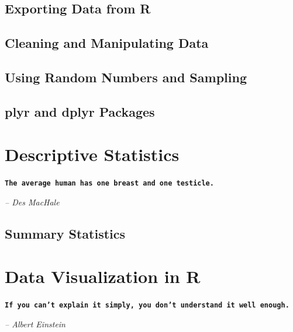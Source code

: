 \documentclass[10pt, letterpaper, twoside]{memoir}\usepackage{knitr}
\newcommand{\chapterendsymbol}{
    \vspace{24pt}
    \Huge
    \hrulefill \hspace{0.1in} \hspace{0.1in} \hrulefill
    \normalsize
    }
\begin{document}
\section{Exporting Data from R}

\section{Cleaning and Manipulating Data}


\section{Using Random Numbers and Sampling}


\section{plyr and dplyr Packages}

\chapterendsymbol





\chapter{Descriptive Statistics}

\begin{flushright}

\textbf{\texttt{The average human has one breast and one testicle.}}

\emph{-- Des MacHale}

\end{flushright}

\vspace{12pt}


\section{Summary Statistics}


\chapterendsymbol





\chapter{Data Visualization in R}

\begin{flushright}

\textbf{\texttt{If you can't explain it simply, you don't understand it well enough.}}

\emph{-- Albert Einstein}

\end{flushright}
\end{document}
